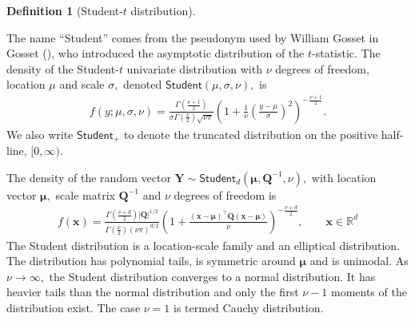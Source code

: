 \documentclass[
  11pt,
  letterpaper,
]{scrbook}
\theoremstyle{definition}
\theoremstyle{plain}
\theoremstyle{plain}
\theoremstyle{plain}
\theoremstyle{definition}
\theoremstyle{definition}
\newtheorem{definition}{Definition}[chapter]
\theoremstyle{plain}
\theoremstyle{plain}
\theoremstyle{remark}
\begin{document}
\begin{definition}[Student-\(t\)
distribution]\protect\hypertarget{def-student-dist}{}\label{def-student-dist}

The name ``Student'' comes from the pseudonym used by William Gosset in
Gosset (), who introduced the
asymptotic distribution of the \(t\)-statistic. The density of the
Student-\(t\) univariate distribution with \(\nu\) degrees of freedom,
location \(\mu\) and scale \(\sigma,\) denoted
\(\mathsf{Student}(\mu, \sigma, \nu),\) is \begin{align*}
f(y; \mu, \sigma, \nu) = \frac{\Gamma \left( \frac{\nu+1}{2}\right)}{\sigma\Gamma\left(\frac{\nu}{2}\right)
\sqrt{\nu\pi}}\left(1+\frac{1}{\nu}\left(\frac{y-\mu}{\sigma}\right)^2\right)^{-\frac{\nu+1}{2}}.
\end{align*} We also write \(\mathsf{Student}_{+}\) to denote the
truncated distribution on the positive half-line, \([0, \infty).\)

The density of the random vector
\(\boldsymbol{Y} \sim \mathsf{Student}_d(\boldsymbol{\mu}, \boldsymbol{Q}^{-1}, \nu),\)
with location vector \(\boldsymbol{\mu},\) scale matrix
\(\boldsymbol{Q}^{-1}\) and \(\nu\) degrees of freedom is \begin{align*}
f(\boldsymbol{x}) = \frac{\Gamma \left( \frac{\nu+d}{2}\right)|\boldsymbol{Q}|^{1/2}}{\Gamma\left(\frac{\nu}{2}\right)
(\nu\pi)^{d/2}}\left(1+\frac{(\boldsymbol{x}-\boldsymbol{\mu})^\top\boldsymbol{Q}(\boldsymbol{x}-\boldsymbol{\mu})}{\nu} \right)^{-\frac{\nu+d}{2}}, \qquad \boldsymbol{x} \in \mathbb{R}^d
\end{align*} The Student distribution is a location-scale family and an
elliptical distribution. The distribution has polynomial tails, is
symmetric around \(\boldsymbol{\mu}\) and is unimodal. As
\(\nu \to \infty,\) the Student distribution converges to a normal
distribution. It has heavier tails than the normal distribution and only
the first \(\nu-1\) moments of the distribution exist. The case
\(\nu=1\) is termed Cauchy distribution.

\end{definition}
\end{document}

